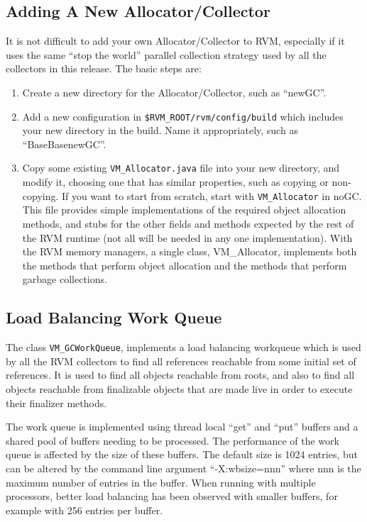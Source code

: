 \subsection{Adding A New Allocator/Collector} \label{sssec:newalloc}
It is not difficult to add your own Allocator/Collector to RVM,
especially if it uses the same ``stop the world'' parallel collection
strategy used by all the collectors in this release.  The basic steps
are:
\begin{enumerate}
\item Create a new directory for the Allocator/Collector, such as ``newGC''.
\item Add a new configuration in {\tt \$RVM\_ROOT/rvm/config/build}
which includes your new directory in the build.  Name it appropriately, such as
``BaseBasenewGC''.
\item Copy some existing {\tt VM\_Allocator.java} file into your new directory,
and modify it, choosing one that has similar properties, such as copying or
non-copying.  If you want to start from scratch, start with 
{\tt VM\_Allocator} in noGC.
This file provides simple implementations of the required object allocation
methods, and stubs for the other fields and methods expected by the rest
of the RVM runtime (not all will be needed in any one implementation).
With the RVM memory managers, a single class, VM\_Allocator, implements both
the methods that perform object allocation and the methods that perform
garbage collections.
\end{enumerate}

\subsection{Load Balancing Work Queue} \label{sssec:workqueue}
The class {\tt VM\_GCWorkQueue}, implements a load balancing workqueue
which is used by all the RVM collectors to find all references reachable from
some initial set of references.  It is used to find all objects reachable
from roots, and also to find all objects reachable from finalizable objects
that are made live in order to execute their finalizer methods.

The work queue is implemented using thread local ``get'' and ``put'' buffers
and a shared pool of buffers needing to be processed.  The performance of the
work queue is affected by the size of these buffers.  The default size is 1024 
entries, but can be altered by the command line argument ``-X:wbsize=nnn'' where
nnn is the maximum number of entries in the buffer.  When running with multiple
processors, better load balancing has been observed with smaller buffers, for
example with 256 entries per buffer.  


